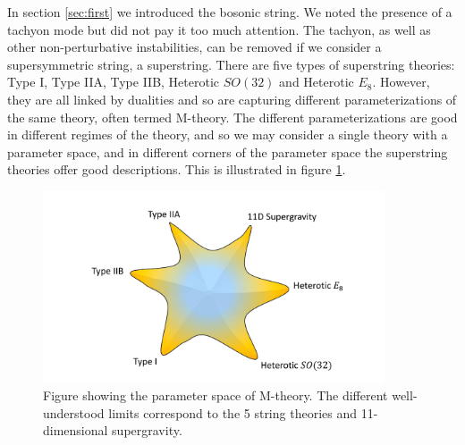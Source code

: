 \documentclass[11pt,a4paper]{article}
\numberwithin{equation}{section}
\numberwithin{table}{section}\setlength{\multlinegap}{25pt}
\begin{document}
In section \ref{sec:first} we introduced the bosonic string. We noted the presence of a tachyon mode but did not pay it too much attention. The tachyon, as well as other non-perturbative instabilities, can be removed if we consider a supersymmetric string, a superstring. There are five types of superstring theories: Type I, Type IIA, Type IIB, Heterotic $SO(32)$ and Heterotic $E_8$. However, they are all linked by dualities and so are capturing different parameterizations of the same theory, often termed M-theory. The different parameterizations are good in different regimes of the theory, and so we may consider a single theory with a parameter space, and in different corners of the parameter space the superstring theories offer good descriptions. This is illustrated in figure \ref{fig:mtheory}.  
\begin{figure}[t]
\centering
 \includegraphics[width=0.9\textwidth]{mtheorystar.pdf}
\caption{Figure showing the parameter space of M-theory. The different well-understood limits correspond to the 5 string theories and 11-dimensional supergravity.}
\label{fig:mtheory}
\end{figure}
\end{document}
